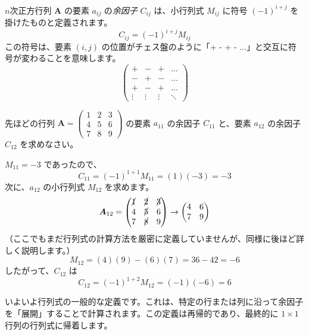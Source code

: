 \begin{dfn}[余因子] \label{cofactor}
$n$次正方行列 $\bm{A}$ の要素 $a_{ij}$ の\emph{余因子} $C_{ij}$ は、小行列式 $M_{ij}$ に符号 $(-1)^{i+j}$ を掛けたものと定義されます。
\[ C_{ij} = (-1)^{i+j}M_{ij} \]
この符号は、要素 $(i, j)$ の位置がチェス盤のように「+ - + - ...」と交互に符号が変わることを意味します。
\[
\begin{pmatrix}
+ & - & + & \dots \\
- & + & - & \dots \\
+ & - & + & \dots \\
\vdots & \vdots & \vdots & \ddots
\end{pmatrix}
\]
\end{dfn}

\begin{ex}
先ほどの行列 $\bm{A} = \begin{pmatrix} 1 & 2 & 3 \\ 4 & 5 & 6 \\ 7 & 8 & 9 \end{pmatrix}$ の要素 $a_{11}$ の余因子 $C_{11}$ と、要素 $a_{12}$ の余因子 $C_{12}$ を求めなさい。\par
$M_{11} = -3$ であったので、
\[ C_{11} = (-1)^{1+1}M_{11} = (1)(-3) = -3 \]
次に、$a_{12}$ の小行列式 $M_{12}$ を求めます。
\[ \bm{A}_{12} = \begin{pmatrix} \cancel{1} & \cancel{2} & \cancel{3} \\ 4 & \cancel{5} & 6 \\ 7 & \cancel{8} & 9 \end{pmatrix} \rightarrow \begin{pmatrix} 4 & 6 \\ 7 & 9 \end{pmatrix} \]
（ここでもまだ行列式の計算方法を厳密に定義していませんが、同様に後ほど詳しく説明します。）
\[ M_{12} = (4)(9) - (6)(7) = 36 - 42 = -6 \]
したがって、$C_{12}$ は
\[ C_{12} = (-1)^{1+2}M_{12} = (-1)(-6) = 6 \]
\end{ex}

いよいよ行列式の一般的な定義です。これは、特定の行または列に沿って余因子を「展開」することで計算されます。この定義は再帰的であり、最終的に $1 \times 1$ 行列の行列式に帰着します。

